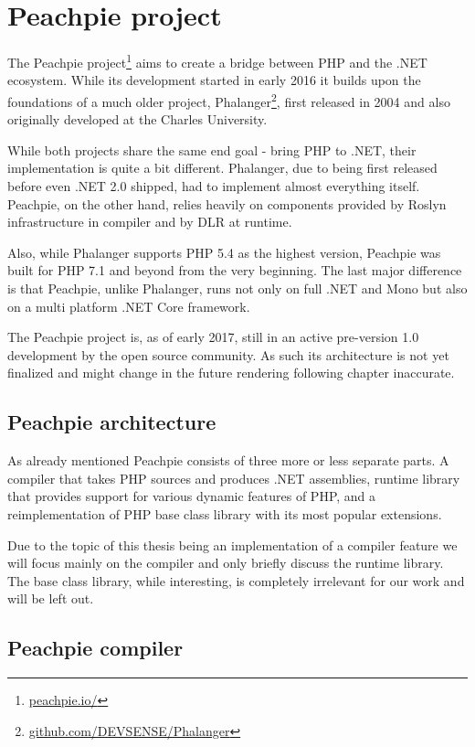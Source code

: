 \chapter{Peachpie project}

The Peachpie project\footnote{\href{http://www.peachpie.io/}{peachpie.io/}} aims to create a bridge between PHP and the .NET ecosystem. While its development started in early 2016 it builds upon the foundations of a much older project, Phalanger\footnote{\href{https://github.com/DEVSENSE/Phalanger}{github.com/DEVSENSE/Phalanger}}, first released in 2004 and also originally developed at the Charles University.

While both projects share the same end goal - bring PHP to .NET, their implementation is quite a bit different. Phalanger, due to being first released before even .NET 2.0 shipped, had to implement almost everything itself. Peachpie, on the other hand, relies heavily on components provided by Roslyn infrastructure in compiler and by DLR at runtime.

Also, while Phalanger supports PHP 5.4 as the highest version, Peachpie was built for PHP 7.1 and beyond from the very beginning. The last major difference is that Peachpie, unlike Phalanger, runs not only on full .NET and Mono but also on a multi platform .NET Core framework.

The Peachpie project is, as of early 2017, still in an active pre-version 1.0 development by the open source community. As such its architecture is not yet finalized and might change in the future rendering following chapter inaccurate.


\section{Peachpie architecture}

As already mentioned Peachpie consists of three more or less separate parts. A compiler that takes PHP sources and produces .NET assemblies, runtime library that provides support for various dynamic features of PHP, and a reimplementation of PHP base class library with its most popular extensions. 

Due to the topic of this thesis being an implementation of a compiler feature we will focus mainly on the compiler and only briefly discuss the runtime library. The base class library, while interesting, is completely irrelevant for our work and will be left out.


\section{Peachpie compiler}


